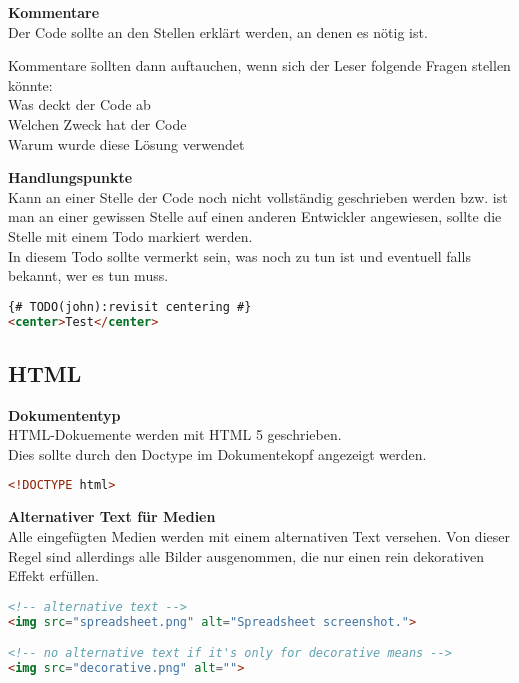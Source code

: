 \textbf{Kommentare}\\
Der Code sollte an den Stellen erklärt werden, an denen es nötig ist.\\
\begin{tabbing}
Kommentare \= sollten dann auftauchen, wenn sich der Leser folgende Fragen stellen könnte:\\
\> Was deckt der Code ab\\
\> Welchen Zweck hat der Code\\
\> Warum wurde diese Lösung verwendet
\end{tabbing}

\textbf{Handlungspunkte}\\
Kann an einer Stelle der Code noch nicht vollständig geschrieben werden bzw. ist man an einer gewissen Stelle auf einen anderen Entwickler angewiesen, sollte die Stelle mit einem Todo markiert werden.\\
In diesem Todo sollte vermerkt sein, was noch zu tun ist und eventuell falls bekannt, wer es tun muss.\\
\begin{lstlisting}[language = HTML, caption = Kennzeichnung eines Handlungspunktes, label = todo]
{# TODO(john):revisit centering #}
<center>Test</center>
\end{lstlisting}
\subsection{HTML}

\textbf{Dokumententyp}\\
HTML-Dokuemente werden mit HTML 5 geschrieben.\\
Dies sollte durch den Doctype im Dokumentekopf angezeigt werden.
\begin{lstlisting}[language = HTML, caption = Kennzeichnung des Dokumententyps, label = doctype]
<!DOCTYPE html>
\end{lstlisting}

\textbf{Alternativer Text für Medien}\\
Alle eingefügten Medien werden mit einem alternativen Text versehen. Von dieser Regel sind allerdings alle Bilder ausgenommen, die nur einen rein dekorativen Effekt erfüllen.
\begin{lstlisting}[language = HTML, caption = Alternativtext, label = alttext]
<!-- alternative text -->
<img src="spreadsheet.png" alt="Spreadsheet screenshot.">

<!-- no alternative text if it's only for decorative means -->
<img src="decorative.png" alt="">
\end{lstlisting}

